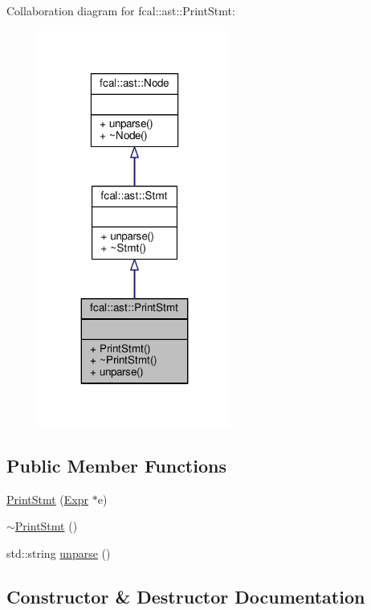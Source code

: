 Collaboration diagram for fcal\+:\+:ast\+:\+:Print\+Stmt\+:
\nopagebreak
\begin{figure}[H]
\begin{center}
\leavevmode
\includegraphics[width=179pt]{classfcal_1_1ast_1_1PrintStmt__coll__graph}
\end{center}
\end{figure}
\subsection*{Public Member Functions}
\begin{DoxyCompactItemize}
\item 
\hyperlink{classfcal_1_1ast_1_1PrintStmt_a599e03a2f7dfe2cdfa054dc25ca16be0}{Print\+Stmt} (\hyperlink{classfcal_1_1ast_1_1Expr}{Expr} $\ast$e)
\item 
\hyperlink{classfcal_1_1ast_1_1PrintStmt_a2bb9d3ba64e1937ca3475cca7c6d4206}{$\sim$\+Print\+Stmt} ()
\item 
std\+::string \hyperlink{classfcal_1_1ast_1_1PrintStmt_afa695345289813cf9f8bb884560a4d5d}{unparse} ()
\end{DoxyCompactItemize}


\subsection{Constructor \& Destructor Documentation}
